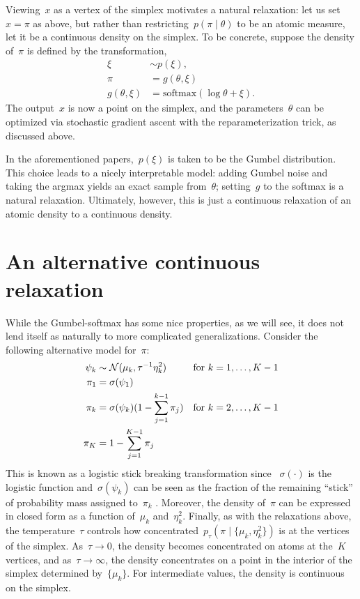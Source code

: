 \documentclass{article}
\begin{document}
Viewing~$x$ as a vertex of the simplex motivates a natural relaxation:
let us set~$x={\pi}$ as above, but 
rather than restricting~$p({\pi} \mid \theta)$ to be an atomic measure,
let it be a continuous density on the simplex. To be concrete, suppose
the density of~${\pi}$ is defined by the transformation,
\begin{align}
  \xi &\sim p(\xi), \\
  {\pi} &= g(\theta, \xi) \\
  g(\theta, \xi) &= \text{softmax}(\log \theta + \xi).
\end{align}
The output~$x$ is now a point on the simplex, and the parameters~$\theta$ can
be optimized via stochastic gradient ascent with the reparameterization trick,
as discussed above.

In the aforementioned papers,~$p(\xi)$ is taken to be the Gumbel distribution.
This choice leads to a nicely interpretable model: adding
Gumbel noise and taking the argmax yields an exact sample from~$\theta$;
setting~$g$ to the softmax is a natural relaxation. Ultimately, however, this
is just a continuous relaxation of an atomic density to a continuous
density. 

\section{An alternative continuous relaxation}
While the Gumbel-softmax has some nice properties, as we will see, it does
not lend itself as naturally to more complicated generalizations. 
Consider the following alternative model for~${\pi}$:
\begin{align}
  \psi_k &\sim \mathcal{N}(\mu_k, \tau^{-1} \eta_k^2) & &  \text{for } k=1, \ldots, K-1\\
  {\pi}_1 &= \sigma(\psi_1) \\
  {\pi}_k &= \sigma(\psi_k) (1- \sum_{j=1}^{k-1} {\pi}_j) & &  \text{for } k=2, \ldots, K-1\\
{\pi}_K &= 1- \sum_{j=1}^{K-1} {\pi}_j
\end{align}
This is known as a logistic stick breaking transformation since
~$\sigma(\cdot)$ is the logistic function and~$\sigma(\psi_k)$ can be
seen as the fraction of the remaining ``stick'' of probability mass
assigned to~${\pi}_k$ \citep{linderman2015dependent}. Moreover,
the density of~${\pi}$ can be expressed in closed form as a
function of~$\mu_k$ and~$\eta_k^2$.  Finally, as with the relaxations
above, the temperature~$\tau$ controls how
concentrated~$p_\tau({\pi} \mid \{\mu_k, \eta_k^2\})$ is at the
vertices of the simplex. As~$\tau \to 0$, the density becomes
concentrated on atoms at the~$K$ vertices, and as~$\tau \to \infty$,
the density concentrates on a point in the interior of the simplex
determined by~$\{\mu_k\}$. For intermediate values, the density is
continuous on the simplex.
\end{document}
